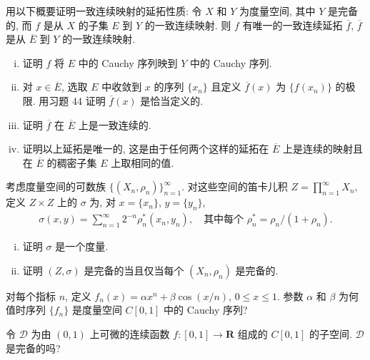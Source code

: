 \documentclass[../../main.tex]{subfiles}
\begin{document}
\begin{exercise}\label{exercise:ch09-45}
用以下概要证明一致连续映射的延拓性质: 令 $X$ 和 $Y$ 为度量空间, 其中 $Y$ 是完备的, 而 $f$ 是从 $X$ 的子集 $E$ 到 $Y$ 的一致连续映射. 则 $f$ 有唯一的一致连续延拓 $\overline{f}$, $\overline{f}$ 是从 $\overline{E}$ 到 $Y$ 的一致连续映射.
\begin{enumerate}[(i)]
\item 证明 $f$ 将 $E$ 中的 Cauchy 序列映到 $Y$ 中的 Cauchy 序列.
\item 对 $x\in\overline{E}$, 选取 $E$ 中收敛到 $x$ 的序列 $\{x_{n}\}$ 且定义 $\overline{f}(x)$ 为 $\{f(x_{n})\}$ 的极限. 用习题 44 证明 $\overline{f}(x)$ 是恰当定义的.
\item 证明 $\overline{f}$ 在 $\overline{E}$ 上是一致连续的.
\item 证明以上延拓是唯一的, 这是由于任何两个这样的延拓在 $\overline{E}$ 上是连续的映射且在 $\overline{E}$ 的稠密子集 $E$ 上取相同的值.
\end{enumerate}
\end{exercise}

\begin{exercise}\label{exercise:ch09-46}
考虑度量空间的可数族 $\{(X_{n},\rho_{n})\}_{n=1}^{\infty}$. 对这些空间的笛卡儿积 $Z=\prod_{n=1}^{\infty}X_{n}$, 定义 $Z\times Z$ 上的 $\sigma$ 为, 对 $x=\{x_{n}\}$, $y=\{y_{n}\}$,
\begin{align*}
\sigma(x,y)=\sum_{n=1}^{\infty}2^{-n}\rho_{n}^{*}(x_{n},y_{n}),\quad\text{其中每个 }\rho_{n}^{*}=\rho_{n}/(1+\rho_{n}).
\end{align*}
\begin{enumerate}[(i)]
\item 证明 $\sigma$ 是一个度量.
\item 证明 $(Z,\sigma)$ 是完备的当且仅当每个 $(X_{n},\rho_{n})$ 是完备的.
\end{enumerate}
\end{exercise}

\begin{exercise}\label{exercise:ch09-47}
对每个指标 $n$, 定义 $f_{n}(x)=\alpha x^{n}+\beta\cos(x/n)$, $0\leqslant x\leqslant 1$. 参数 $\alpha$ 和 $\beta$ 为何值时序列 $\{f_{n}\}$ 是度量空间 $C[0,1]$ 中的 Cauchy 序列?
\end{exercise}

\begin{exercise}\label{exercise:ch09-48}
令 $\mathcal{D}$ 为由 $(0,1)$ 上可微的连续函数 $f:[0,1]\to\mathbf{R}$ 组成的 $C[0,1]$ 的子空间. $\mathcal{D}$ 是完备的吗?
\end{exercise}
\end{document}
